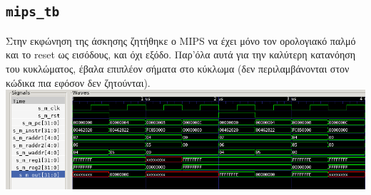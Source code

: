 \documentclass{article}
\begin{document}
\subsection{\lstinline{mips_tb}}

Στην εκφώνηση της άσκησης ζητήθηκε ο MIPS να έχει μόνο τον ορολογιακό παλμό
και το reset ως εισόδους, και όχι εξόδο. Παρ'όλα αυτά για την καλύτερη κατανόηση
του κυκλώματος, έβαλα επιπλέον σήματα στο κύκλωμα (δεν περιλαμβάνονται στον
κώδικα πια εφόσον δεν ζητούνται). \\

\includegraphics[width=\textwidth]{res/mips.png}
\end{document}
